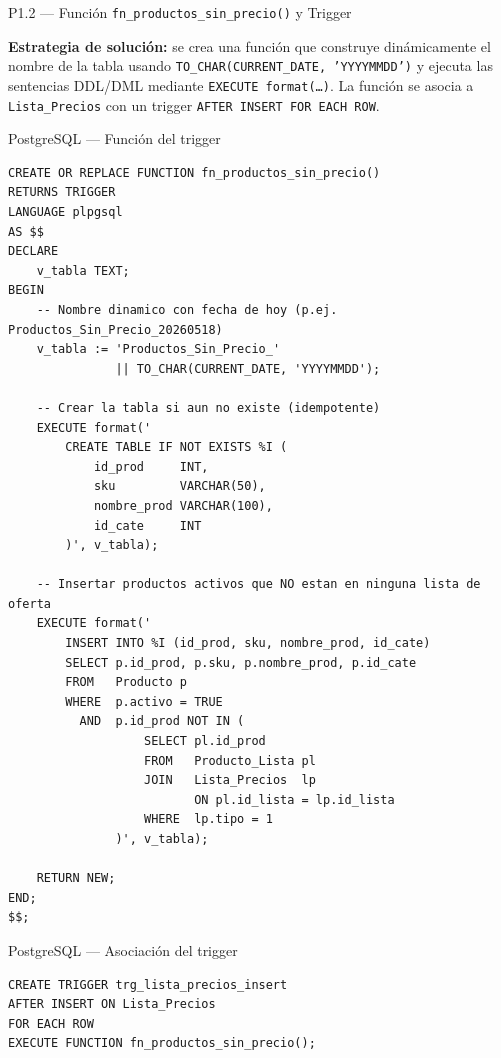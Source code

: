 \documentclass[12pt,a4paper]{article}
\begin{document}
\begin{querybox}{P1.2 --- Función \texttt{fn\_productos\_sin\_precio()} y Trigger}

\textbf{Estrategia de solución:} se crea una función que construye
dinámicamente el nombre de la tabla usando \texttt{TO\_CHAR(CURRENT\_DATE,
'YYYYMMDD')} y ejecuta las sentencias DDL/DML mediante \texttt{EXECUTE format(\ldots)}.
La función se asocia a \texttt{Lista\_Precios} con un trigger \texttt{AFTER INSERT FOR EACH ROW}.

\vspace{0.4cm}

\begin{sqlbox}{PostgreSQL --- Función del trigger}
\begin{lstlisting}[style=sqlstyle]
CREATE OR REPLACE FUNCTION fn_productos_sin_precio()
RETURNS TRIGGER
LANGUAGE plpgsql
AS $$
DECLARE
    v_tabla TEXT;
BEGIN
    -- Nombre dinamico con fecha de hoy (p.ej. Productos_Sin_Precio_20260518)
    v_tabla := 'Productos_Sin_Precio_'
               || TO_CHAR(CURRENT_DATE, 'YYYYMMDD');

    -- Crear la tabla si aun no existe (idempotente)
    EXECUTE format('
        CREATE TABLE IF NOT EXISTS %I (
            id_prod     INT,
            sku         VARCHAR(50),
            nombre_prod VARCHAR(100),
            id_cate     INT
        )', v_tabla);

    -- Insertar productos activos que NO estan en ninguna lista de oferta
    EXECUTE format('
        INSERT INTO %I (id_prod, sku, nombre_prod, id_cate)
        SELECT p.id_prod, p.sku, p.nombre_prod, p.id_cate
        FROM   Producto p
        WHERE  p.activo = TRUE
          AND  p.id_prod NOT IN (
                   SELECT pl.id_prod
                   FROM   Producto_Lista pl
                   JOIN   Lista_Precios  lp
                          ON pl.id_lista = lp.id_lista
                   WHERE  lp.tipo = 1
               )', v_tabla);

    RETURN NEW;
END;
$$;
\end{lstlisting}
\end{sqlbox}

\vspace{0.4cm}

\begin{sqlbox}{PostgreSQL --- Asociación del trigger}
\begin{lstlisting}[style=sqlstyle]
CREATE TRIGGER trg_lista_precios_insert
AFTER INSERT ON Lista_Precios
FOR EACH ROW
EXECUTE FUNCTION fn_productos_sin_precio();
\end{lstlisting}
\end{sqlbox}


\end{querybox}
\end{document}
